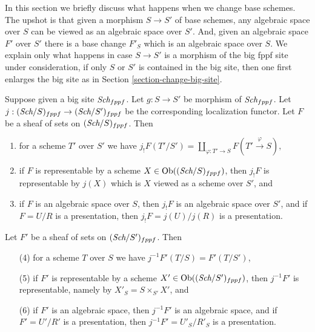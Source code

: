 \noindent
In this section we briefly discuss what happens when we change base schemes.
The upshot is that given a morphism $S \to S'$ of base schemes, any algebraic
space over $S$ can be viewed as an algebraic space over $S'$. And, given an
algebraic space $F'$ over $S'$ there is a base change $F'_S$ which is
an algebraic space over $S$.
We explain only what happens in case $S \to S'$ is a morphism of the
big fppf site under consideration, if only $S$ or $S'$ is contained in the
big site, then one first enlarges the big site as in
Section \ref{section-change-big-site}.

\begin{lemma}
\label{lemma-change-base-scheme}
Suppose given a big site $\textit{Sch}_{fppf}$.
Let $g : S \to S'$ be morphism of $\textit{Sch}_{fppf}$.
Let $j : (\textit{Sch}/S)_{fppf} \to (\textit{Sch}/S')_{fppf}$ be
the corresponding localization functor.
Let $F$ be a sheaf of sets on $(\textit{Sch}/S)_{fppf}$.
Then
\begin{enumerate}
\item for a scheme $T'$ over $S'$ we have
$j_!F(T'/S') =
\coprod\nolimits_{\varphi : T' \to S} F(T' \xrightarrow{\varphi} S),$
\item if $F$ is representable by a scheme
$X \in \mathop{\rm Ob}\nolimits((\textit{Sch}/S)_{fppf})$,
then $j_!F$ is representable by $j(X)$ which is
$X$ viewed as a scheme over $S'$, and
\item if $F$ is an algebraic space over $S$, then $j_!F$ is an algebraic
space over $S'$, and if $F = U/R$ is a presentation, then
$j_!F = j(U)/j(R)$ is a presentation.
\end{enumerate}
Let $F'$ be a sheaf of sets on $(\textit{Sch}/S')_{fppf}$. Then
\begin{enumerate}
\item[(4)] for a scheme $T$ over $S$ we have $j^{-1}F'(T/S) = F'(T/S')$,
\item[(5)] if $F'$ is representable by a scheme
$X' \in \mathop{\rm Ob}\nolimits((\textit{Sch}/S')_{fppf})$, then
$j^{-1}F'$ is representable, namely by $X'_S = S \times_{S'} X'$, and
\item[(6)] if $F'$ is an algebraic space, then
$j^{-1}F'$ is an algebraic space, and if $F' = U'/R'$ is a presentation,
then $j^{-1}F' = U'_S/R'_S$ is a presentation.
\end{enumerate}
\end{lemma}

